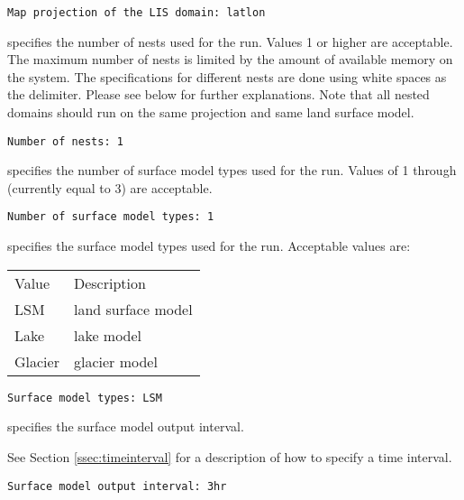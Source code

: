  \begin{Verbatim}[frame=single]
Map projection of the LIS domain: latlon
 \end{Verbatim}
 

 
  specifies the number of nests used for the run. 
 Values 1 or higher are acceptable. The maximum number of nests is
 limited by the amount of available memory on the system. 
 The specifications for different nests are done using white spaces 
 as the delimiter. Please see below for further explanations. Note 
 that all nested domains should run on the same projection and same 
 land surface model.
 

 \begin{Verbatim}[frame=single]
Number of nests: 1
 \end{Verbatim}

 
  specifies the number of surface
 model types used for the run. 
 Values of 1 through 
 (currently equal to 3)
 are acceptable.
 

 \begin{Verbatim}[frame=single]
Number of surface model types: 1
 \end{Verbatim}

 
  specifies the surface model types
 used for the run. 
 Acceptable values are:

 \begin{tabular}{ll}
 Value   &  Description        \\
 LSM     & land surface model  \\
 Lake    & lake model          \\
 Glacier & glacier model       \\
 \end{tabular}
 

 \begin{Verbatim}[frame=single]
Surface model types: LSM
 \end{Verbatim}

 
  specifies the surface model
 output interval.

 See Section \ref{ssec:timeinterval} for a description
 of how to specify a time interval.
 

 \begin{Verbatim}[frame=single]
Surface model output interval: 3hr
 \end{Verbatim}

